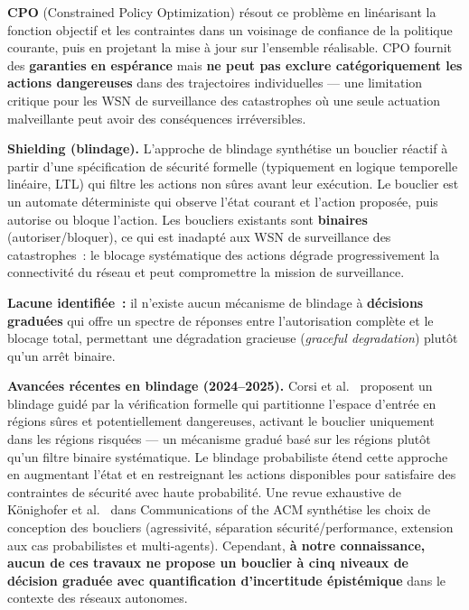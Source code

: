 \textbf{CPO} (Constrained Policy Optimization) \cite{achiam2017cpo} résout ce problème en linéarisant la fonction objectif et les contraintes dans un voisinage de confiance de la politique courante, puis en projetant la mise à jour sur l'ensemble réalisable. CPO fournit des \textbf{garanties en espérance} mais \textbf{ne peut pas exclure catégoriquement les actions dangereuses} dans des trajectoires individuelles --- une limitation critique pour les WSN de surveillance des catastrophes où une seule actuation malveillante peut avoir des conséquences irréversibles.

\textbf{Shielding (blindage).} L'approche de blindage \cite{alshiekh2018shielding} synthétise un bouclier réactif à partir d'une spécification de sécurité formelle (typiquement en logique temporelle linéaire, LTL) qui filtre les actions non sûres avant leur exécution. Le bouclier est un automate déterministe qui observe l'état courant et l'action proposée, puis autorise ou bloque l'action. Les boucliers existants sont \textbf{binaires} (autoriser/bloquer), ce qui est inadapté aux WSN de surveillance des catastrophes~: le blocage systématique des actions dégrade progressivement la connectivité du réseau et peut compromettre la mission de surveillance.

\textbf{Lacune identifiée~:} il n'existe aucun mécanisme de blindage à \textbf{décisions graduées} qui offre un spectre de réponses entre l'autorisation complète et le blocage total, permettant une dégradation gracieuse (\emph{graceful degradation}) plutôt qu'un arrêt binaire.

\textbf{Avancées récentes en blindage (2024--2025).} Corsi et al.\ \cite{corsi2024verification} proposent un blindage guidé par la vérification formelle qui partitionne l'espace d'entrée en régions sûres et potentiellement dangereuses, activant le bouclier uniquement dans les régions risquées --- un mécanisme gradué basé sur les régions plutôt qu'un filtre binaire systématique. Le blindage probabiliste \cite{corsi2025prob_shielding} étend cette approche en augmentant l'état et en restreignant les actions disponibles pour satisfaire des contraintes de sécurité avec haute probabilité. Une revue exhaustive de Könighofer et al.\ \cite{pranger2025shields} dans Communications of the ACM synthétise les choix de conception des boucliers (agressivité, séparation sécurité/performance, extension aux cas probabilistes et multi-agents). Cependant, \textbf{à notre connaissance, aucun de ces travaux ne propose un bouclier à cinq niveaux de décision graduée avec quantification d'incertitude épistémique} dans le contexte des réseaux autonomes.

